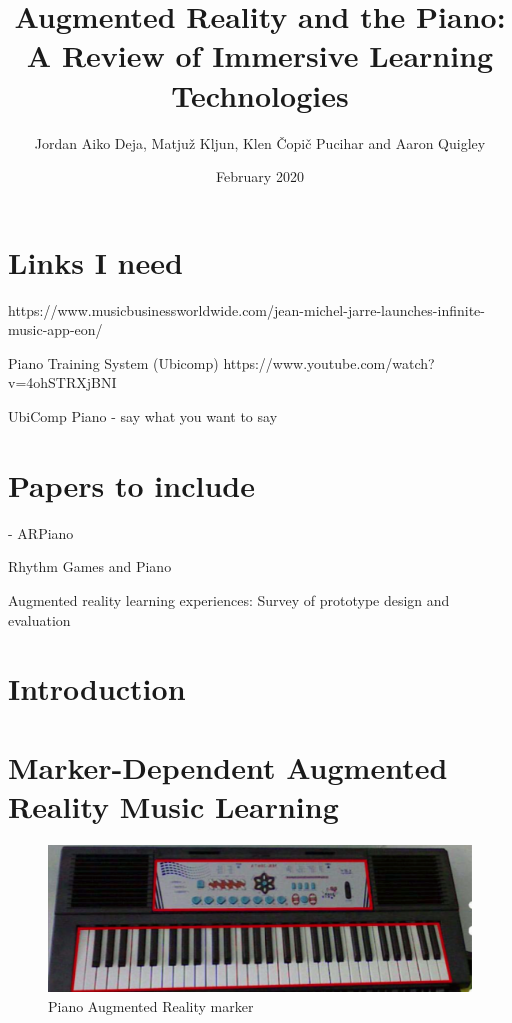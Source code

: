 \documentclass{article}
\title{Augmented Reality and the Piano: A Review of Immersive Learning Technologies}
\author{Jordan Aiko Deja, Matjuž Kljun, Klen Čopič Pucihar and Aaron Quigley}
\date{February 2020}
\begin{document}
\maketitle

\section{Links I need}

https://www.musicbusinessworldwide.com/jean-michel-jarre-launches-infinite-music-app-eon/

Piano Training System (Ubicomp)
https://www.youtube.com/watch?v=4ohSTRXjBNI




UbiComp Piano - say what you want to say 
\cite{Weing:2013:PEI:2494091.2494113}


\section{Papers to include}

\nocite{*}



\cite{ARPiano-2018} - ARPiano 

Rhythm Games and Piano 

Augmented reality learning experiences: Survey of prototype design and evaluation

\section{Introduction}

\section{Marker-Dependent Augmented Reality Music Learning}

\begin{figure}
    \centering
    \includegraphics[width=15cm]{figures/pianomarker.png}
    \caption{Piano Augmented Reality marker}
    \label{fig:pianomarker}
\end{figure}
\end{document}
